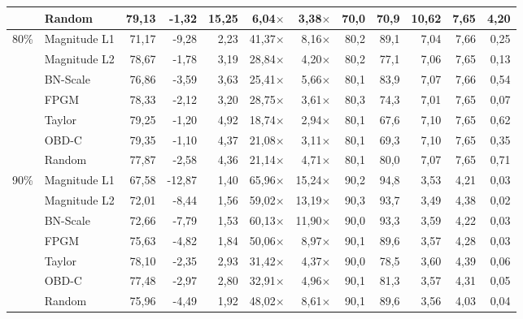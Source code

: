 \begin{table}[H]
{{\begin{tabular}{c l rr rrr rr rrr}
     & Random & 79,13 & -1,32 & 15,25 & 6,04$\times$ & 3,38$\times$ & 70,0 & 70,9 & 10,62 & 7,65 & 4,20 \\
    \midrule
    \multirow{7}{*}{80\%} & Magnitude L1 & 71,17 & -9,28 & 2,23 & 41,37$\times$ & 8,16$\times$ & 80,2 & 89,1 & 7,04 & 7,66 & 0,25 \\
     & Magnitude L2 & 78,67 & -1,78 & 3,19 & 28,84$\times$ & 4,20$\times$ & 80,2 & 77,1 & 7,06 & 7,65 & 0,13 \\
     & BN-Scale & 76,86 & -3,59 & 3,63 & 25,41$\times$ & 5,66$\times$ & 80,1 & 83,9 & 7,07 & 7,66 & 0,54 \\
     & FPGM & 78,33 & -2,12 & 3,20 & 28,75$\times$ & 3,61$\times$ & 80,3 & 74,3 & 7,01 & 7,65 & 0,07 \\
     & Taylor & 79,25 & -1,20 & 4,92 & 18,74$\times$ & 2,94$\times$ & 80,1 & 67,6 & 7,10 & 7,65 & 0,62 \\
     & OBD-C & 79,35 & -1,10 & 4,37 & 21,08$\times$ & 3,11$\times$ & 80,1 & 69,3 & 7,10 & 7,65 & 0,35 \\
     & Random & 77,87 & -2,58 & 4,36 & 21,14$\times$ & 4,71$\times$ & 80,1 & 80,0 & 7,07 & 7,65 & 0,71 \\
    \midrule
    \multirow{7}{*}{90\%} & Magnitude L1 & 67,58 & -12,87 & 1,40 & 65,96$\times$ & 15,24$\times$ & 90,2 & 94,8 & 3,53 & 4,21 & 0,03 \\
     & Magnitude L2 & 72,01 & -8,44 & 1,56 & 59,02$\times$ & 13,19$\times$ & 90,3 & 93,7 & 3,49 & 4,38 & 0,02 \\
     & BN-Scale & 72,66 & -7,79 & 1,53 & 60,13$\times$ & 11,90$\times$ & 90,0 & 93,3 & 3,59 & 4,22 & 0,03 \\
     & FPGM & 75,63 & -4,82 & 1,84 & 50,06$\times$ & 8,97$\times$ & 90,1 & 89,6 & 3,57 & 4,28 & 0,03 \\
     & Taylor & 78,10 & -2,35 & 2,93 & 31,42$\times$ & 4,37$\times$ & 90,0 & 78,5 & 3,60 & 4,39 & 0,06 \\
     & OBD-C & 77,48 & -2,97 & 2,80 & 32,91$\times$ & 4,96$\times$ & 90,1 & 81,3 & 3,57 & 4,31 & 0,05 \\
     & Random & 75,96 & -4,49 & 1,92 & 48,02$\times$ & 8,61$\times$ & 90,1 & 89,6 & 3,56 & 4,03 & 0,04 \\
    \bottomrule
  \end{tabular}}}
\end{table}
